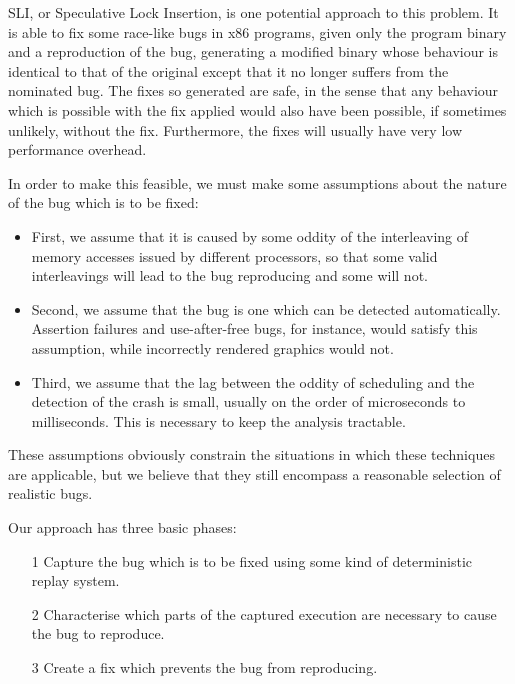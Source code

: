 \documentclass[10pt,a4paper,twocolumn]{article}
\begin{document}
SLI, or Speculative Lock Insertion, is one potential approach to this
problem.  It is able to fix some race-like bugs in x86 programs, given
only the program binary and a reproduction of the bug, generating a
modified binary whose behaviour is identical to that of the original
except that it no longer suffers from the nominated bug.  The fixes so
generated are safe, in the sense that any behaviour which is possible
with the fix applied would also have been possible, if sometimes
unlikely, without the fix.  Furthermore, the fixes will usually have
very low performance overhead.

In order to make this feasible, we must make some assumptions about
the nature of the bug which is to be fixed:

\begin{itemize}
\item First, we assume that it is caused by some oddity of the
  interleaving of memory accesses issued by different processors, so
  that some valid interleavings will lead to the bug reproducing and
  some will not.

\item Second, we assume that the bug is one which can be detected
  automatically.  Assertion failures and use-after-free bugs, for
  instance, would satisfy this assumption, while incorrectly rendered
  graphics would not.

\item Third, we assume that the lag between the oddity of scheduling
  and the detection of the crash is small, usually on the order of
  microseconds to milliseconds.  This is necessary to keep the
  analysis tractable.
\end{itemize}

These assumptions obviously constrain the situations in which these
techniques are applicable, but we believe that they still encompass a
reasonable selection of realistic bugs.

Our approach has three basic phases:

\begin{itemize}
\item[1] Capture the bug which is to be fixed using some kind of
  deterministic replay system.
\item[2] Characterise which parts of the captured execution are
  necessary to cause the bug to reproduce.
\item[3] Create a fix which prevents the bug from reproducing.
\end{itemize}
\end{document}
